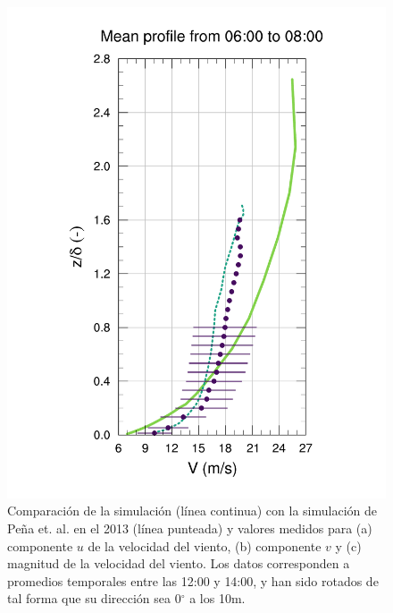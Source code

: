 \begin{figure}[H]
\begin{center}
	\includegraphics[height=0.62\linewidth,page=37,trim={48mm 10mm 41mm 25mm},clip]{Imagenes/06/hov/9V}%
	\end{center}
	\caption{Comparación de la simulación (línea continua) con la simulación de Peña et. al. en el 2013 (línea punteada) y valores medidos para (a) componente $u$ de la velocidad del viento, (b) componente $v$ y (c) magnitud de la velocidad del viento. Los datos corresponden a promedios temporales entre las 12:00 y 14:00, y han sido rotados de tal forma que su dirección sea 0$^\circ$ a los 10m.}
	\label{fig:06_hov_peña}
\end{figure}

